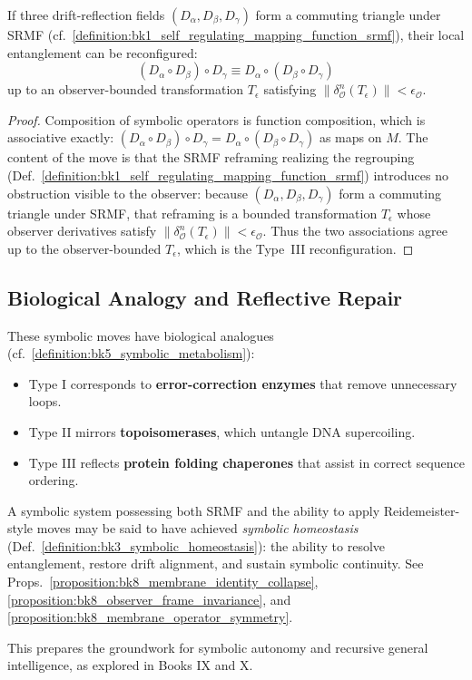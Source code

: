 \begin{proposition}
\label{proposition:bk8_membrane_operator_symmetry}
If three drift-reflection fields \( (D_\alpha, D_\beta, D_\gamma) \) form a commuting triangle under SRMF (cf.~\ref{definition:bk1_self_regulating_mapping_function_srmf}), their local entanglement can be reconfigured:
\[
(D_\alpha \circ D_\beta) \circ D_\gamma \equiv D_\alpha \circ (D_\beta \circ D_\gamma)
\]
up to an observer-bounded transformation \( T_\epsilon \) satisfying \( \|\delta^n_\mathcal{O}(T_\epsilon)\| < \epsilon_\mathcal{O} \).
\end{proposition}
\begin{proof}
\label{proof:bk8_membrane_operator_symmetry}
\leavevmode
Composition of symbolic operators is function composition, which is associative exactly: $(D_\alpha\circ D_\beta)\circ D_\gamma=D_\alpha\circ(D_\beta\circ D_\gamma)$ as maps on $M$. The content of the move is that the SRMF reframing realizing the regrouping (Def.~\ref{definition:bk1_self_regulating_mapping_function_srmf}) introduces no obstruction visible to the observer: because $(D_\alpha,D_\beta,D_\gamma)$ form a commuting triangle under SRMF, that reframing is a bounded transformation $T_\epsilon$ whose observer derivatives satisfy $\|\delta^n_{\mathcal O}(T_\epsilon)\|<\epsilon_{\mathcal O}$. Thus the two associations agree up to the observer-bounded $T_\epsilon$, which is the Type~III reconfiguration.
\end{proof}
\subsection{Biological Analogy and Reflective Repair}
\label{subsec:bk8_symbolic_frame_shift}
These symbolic moves have biological analogues (cf.~\ref{definition:bk5_symbolic_metabolism}):
\begin{itemize}
  \item Type I corresponds to \textbf{error-correction enzymes} that remove unnecessary loops.
  \item Type II mirrors \textbf{topoisomerases}, which untangle DNA supercoiling.
  \item Type III reflects \textbf{protein folding chaperones} that assist in correct sequence ordering.
\end{itemize}
\begin{remark}
\label{remark:bk8_symbolic_repair_loop}
A symbolic system possessing both SRMF and the ability to apply Reidemeister-style moves may be said to have achieved \emph{symbolic homeostasis} (Def.~\ref{definition:bk3_symbolic_homeostasis}): the ability to resolve entanglement, restore drift alignment, and sustain symbolic continuity.
See Props.~\ref{proposition:bk8_membrane_identity_collapse}, \ref{proposition:bk8_observer_frame_invariance}, and \ref{proposition:bk8_membrane_operator_symmetry}.
\end{remark}
This prepares the groundwork for symbolic autonomy and recursive general intelligence, as explored in Books IX and X.

